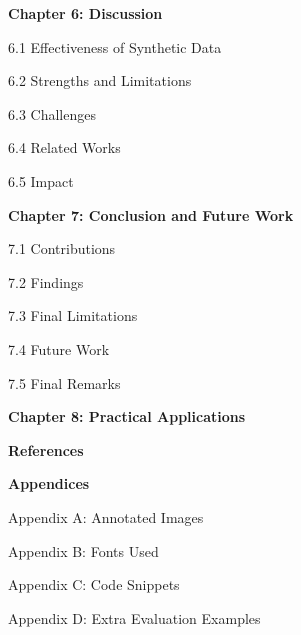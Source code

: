 \begin{adjustwidth}{0.2cm}{0.2cm}
    \vspace{0.5cm}
    {\large \textbf{Chapter 6: Discussion}\dotfill\pageref{ch:discussion}\par}
    {\large 6.1 Effectiveness of Synthetic Data\dotfill\pageref{sec:effectiveness}\par}
    {\large 6.2 Strengths and Limitations\dotfill\pageref{sec:strengths}\par}
    {\large 6.3 Challenges\dotfill\pageref{sec:challenges}\par}
    {\large 6.4 Related Works\dotfill\pageref{sec:related-works}\par}
    {\large 6.5 Impact\dotfill\pageref{sec:impact}\par}

    \vspace{0.5cm}
    {\large \textbf{Chapter 7: Conclusion and Future Work}\dotfill\pageref{ch:conclusion}\par}
    {\large 7.1 Contributions\dotfill\pageref{sec:contributions}\par}
    {\large 7.2 Findings\dotfill\pageref{sec:findings}\par}
    {\large 7.3 Final Limitations\dotfill\pageref{sec:final-limitations}\par}
    {\large 7.4 Future Work\dotfill\pageref{sec:future}\par}
    {\large 7.5 Final Remarks\dotfill\pageref{sec:remarks}\par}

    \vspace{0.5cm}
    {\large \textbf{Chapter 8: Practical Applications}\dotfill\par}

    \vspace{0.5cm}
    {\large \textbf{References}\dotfill\par}

    \vspace{0.5cm}
    {\large \textbf{Appendices}\par}
    {\large Appendix A: Annotated Images\dotfill\pageref{appendix-a}\par}
    {\large Appendix B: Fonts Used\dotfill\pageref{appendix-b}\par}
    {\large Appendix C: Code Snippets\dotfill\pageref{appendix-c}\par}
    {\large Appendix D: Extra Evaluation Examples\dotfill\pageref{appendix-d}\par}

\end{adjustwidth}
